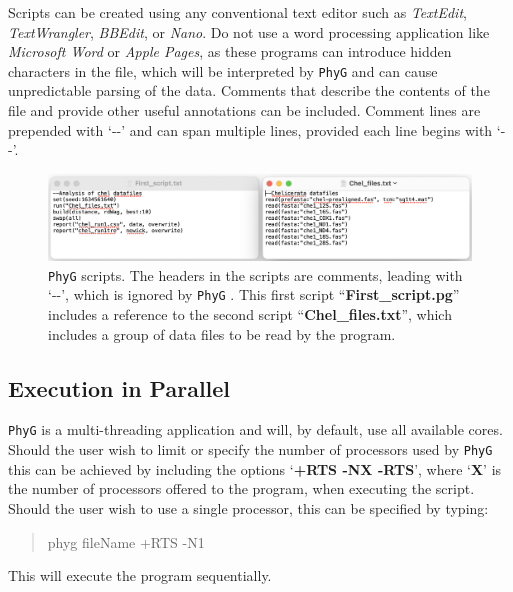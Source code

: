 \documentclass[11pt]{book}
\newcommand{\phyg}{\texttt{PhyG} }
\begin{document}
{{		Scripts can be created using any conventional text editor such as \textit{TextEdit}, 
		\textit{TextWrangler}, \textit{BBEdit}, or \textit{Nano}. Do not use a word processing 
		application like \textit{Microsoft Word} or \textit{Apple Pages}, as these programs 
		can introduce hidden characters in the file, which will be interpreted by \phyg and 
		can cause unpredictable parsing of the data. Comments that describe the contents 
		of the file and provide other useful annotations can be included. Comment lines are 
		prepended with `-{}-' and can span multiple lines, provided each line begins with `-{}-'. 


		\begin{figure}[H]
		\centering
		\includegraphics[width=\textwidth]{First_run.jpg}
		\caption{\phyg scripts. The headers in the scripts are comments, leading with `-{}-', 
		which is ignored by \phyg. This first script ``\textbf{First\_script.pg}'' includes a reference 
		to the second script ``\textbf{Chel\_files.txt}'', which includes a group of data files to be 
		read by the program.}
		\label{firstscript}
		\end{figure}
	
	\subsection{Execution in Parallel}
	\label{subsec:parallel}
		\phyg is a multi-threading application and will, by default,  use
		all available cores. Should the user wish to limit or 
		specify the number of processors used by \phyg this can be achieved by including the 
		options `\textbf{+RTS -NX -RTS}', where `\textbf{X}' is the number of processors offered 
		to the program, when executing the script. Should the user wish to use a single processor, 
		this can be specified by typing:

		\begin{quote}
		phyg fileName +RTS -N1 
		\end{quote}
		
		\medskip
		\noindent This will execute the program sequentially.		

}}
\end{document}
